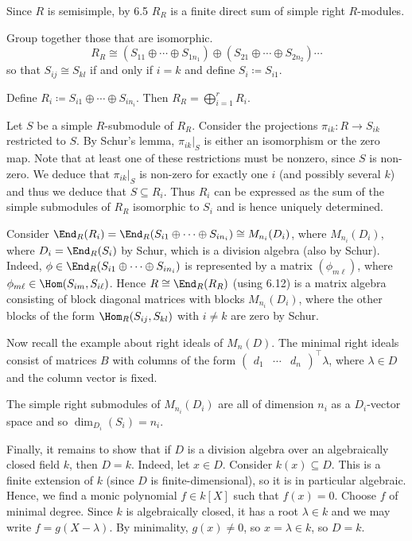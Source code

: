 Since $R$ is semisimple, by 6.5 $R_R$ is a finite direct sum of simple
right $R$-modules.

Group together those that are isomorphic.
\[ R_R \cong (S_{11} \oplus \cdots \oplus S_{1n_1}) \oplus (S_{21}\oplus \cdots\oplus S_{2n_2}) \cdots \]
so that $S_{ij} \cong S_{kl}$ if and only if $i = k$ and define $S_i\coloneqq S_{i1}$.

Define $R_i\coloneqq S_{i1}\oplus\cdots\oplus S_{in_i}$. Then
$R_R = \bigoplus_{i=1}^r R_i$.

Let $S$ be a simple $R$-submodule of $R_R$. Consider the projections
$\pi_{ik}\colon R\to S_{ik}$ restricted to $S$. By Schur's lemma,
$\pi_{ik}|_S$ is either an isomorphism or the zero map. Note that at least
one of these restrictions must be nonzero, since $S$ is non-zero. We deduce that
$\pi_{ik}|_S$ is non-zero for exactly one $i$ (and possibly several $k$) and
thus we deduce that $S \subseteq R_i$. Thus $R_i$ can be expressed as the
sum of the simple submodules of $R_R$ isomorphic to $S_i$ and is hence uniquely
determined.

Consider $\End_R(R_i) = \End_R(S_{i1}\oplus\cdots\oplus S_{in_i}) \cong M_{n_i}(D_i)$,
where $M_{n_i}(D_i)$, where $D_i = \End_{R}(S_i)$ by Schur, which is a
division algebra (also by Schur). Indeed,  $\phi  \in \End_R(S_{i1}\oplus\cdots\oplus S_{in_i})$ is
represented by a matrix $(\phi_{m\ell})$, where $\phi_{m\ell} \in \Hom(S_{im}, S_{i\ell})$.
Hence $R\cong \End_R(R_R)$ (using 6.12) is a matrix algebra consisting of
block diagonal matrices with blocks $M_{n_i}(D_i)$, where the other blocks
of the form $\Hom_R(S_{ij}, S_{kl})$ with $i\neq k$ are zero by Schur.

Now recall the example about right ideals of $M_n(D)$. The minimal right ideals
consist of matrices $B$ with columns of the form $\begin{pmatrix}d_1 & \cdots & d_n\end{pmatrix}^\top \lambda$,
where  $\lambda \in D$ and the column vector is fixed.

The simple right submodules of $M_{n_i}(D_i)$ are all of dimension $n_i$ as a
$D_i$-vector space and so $\dim_{D_i}(S_i) = n_i$.

Finally, it remains to show that if $D$ is a division algebra over an algebraically
closed field $k$, then $D= k$. Indeed, let $x \in D$. Consider $k(x) \subseteq D$.
This is a finite extension of $k$ (since $D$ is finite-dimensional), so it is
in particular algebraic. Hence, we find a monic polynomial $f \in k[X]$  such that
$f(x) = 0$. Choose $f$ of minimal degree. Since $k$ is algebraically closed, it has
a root $\lambda \in k$ and we may write $f = g(X-\lambda)$. By minimality, $g(x)\neq 0$,
so $x = \lambda \in k$, so $D = k$.
